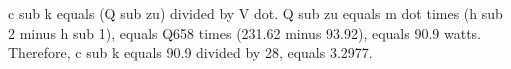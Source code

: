 c sub k equals (Q sub zu) divided by V dot.  
Q sub zu equals m dot times (h sub 2 minus h sub 1), equals Q658 times (231.62 minus 93.92), equals 90.9 watts.  
Therefore, c sub k equals 90.9 divided by 28, equals 3.2977.
